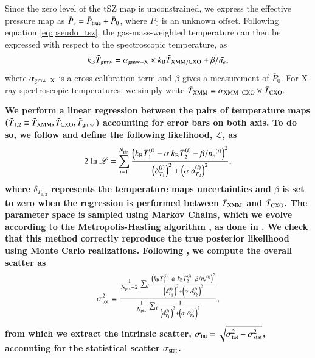 \documentclass[twocolumn,traditabstract]{aa}
\begin{document}
Since the zero level of the tSZ map is unconstrained, we express the effective pressure map as $\bar{P}_e = \bar{P}_{\rm true} + \bar{P}_0$, where $\bar{P}_0$ is an unknown offset. Following equation \ref{eq:pseudo_tsz}, the gas-mass-weighted temperature can then be expressed with respect to the spectroscopic temperature, as
\begin{equation}
k_{\rm B} \bar{T}_{\rm gmw} = \alpha_{\rm gmw-X} \times k_{\rm B} \bar{T}_{\rm XMM/CXO} + {\beta}/{\bar{n_e}},
\label{eq:TSZ_TX_regression}
\end{equation}
where $\alpha_{\rm gmw-X}$ is a cross-calibration term and $\beta$ gives a measurement of $\bar{P}_0$. For X-ray spectroscopic temperatures, we simply write $\bar{T}_{\rm XMM} = \alpha_{\rm XMM-CXO} \times \bar{T}_{\rm CXO}$. 

{\bf We perform a linear regression between the pairs of temperature maps ($\bar{T}_{1,2} \equiv \bar{T}_{\rm XMM}, \bar{T}_{\rm CXO}, \bar{T}_{\rm gmw}$) accounting for error bars on both axis. To do so, we follow \cite{Orear1982} and define the following likelihood, $\mathscr{L}$, as
\begin{equation}
2 \ {\rm ln} \ \mathscr{L} = \sum_{i=1}^{N_{\rm pix}} \frac{\left(k_{\rm B} \bar{T}^{(i)}_{1} - \alpha \ k_{\rm B} \bar{T}^{(i)}_{2} - {\beta}/{\bar{n_e}^{(i)}}\right)^2}{\left(\delta^{(i)}_{T_{1}}\right)^2 + \left(\alpha \ \delta^{(i)}_{T_{2}}\right)^2},
\label{eq:chi2_def}
\end{equation}
where $\delta_{T_{1,2}}$ represents the temperature maps uncertainties and $\beta$ is set to zero when the regression is performed between $\bar{T}_{\rm XMM}$ and $\bar{T}_{\rm CXO}$. The parameter space is sampled using Markov Chains, which we evolve according to the Metropolis-Hasting algorithm \citep{Chib1995}, as done in \cite{Adam2015}. We check that this method correctly reproduce the true posterior likelihood using Monte Carlo realizations. Following \citep{Pratt2009}, we compute the overall scatter as
\begin{equation}
\sigma_{\rm tot}^2 = \frac{\frac{1}{N_{\rm pix} - 2} \sum_i \frac{\left(k_{\rm B} \bar{T}^{(i)}_{1} - \alpha \ k_{\rm B} \bar{T}^{(i)}_{2} - {\beta}/{\bar{n_e}^{(i)}}\right)^2}{\left(\delta^{(i)}_{T_{1}}\right)^2 + \left(\alpha \ \delta^{(i)}_{T_{2}}\right)^2}}{\frac{1}{N_{\rm pix}} \sum_i \frac{1}{\left(\delta^{(i)}_{T_{1}}\right)^2 + \left(\alpha \ \delta^{(i)}_{T_{2}}\right)^2}},
\label{eq:scatter_def}
\end{equation}
from which we extract the intrinsic scatter, $\sigma_{\rm int} = \sqrt{\sigma_{\rm tot}^2 - \sigma_{\rm stat}^2}$, accounting for the statistical scatter $\sigma_{\rm stat}$.}
\end{document}
